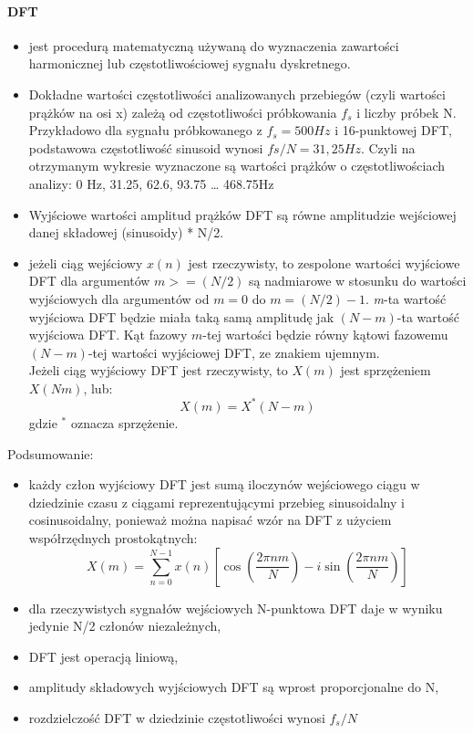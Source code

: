\documentclass[a4paper,twoside]{report}
\begin{document}
\paragraph{DFT}
\begin{itemize}
	\item jest procedurą matematyczną używaną do wyznaczenia zawartości harmonicznej lub częstotliwościowej sygnału dyskretnego.
	\item Dokładne wartości częstotliwości analizowanych przebiegów (czyli wartości prążków na osi x) zależą od częstotliwości próbkowania $ f_s $ i liczby próbek N. Przykładowo dla sygnału próbkowanego z $ f_s = 500 Hz $  i 16-punktowej DFT, podstawowa częstotliwość sinusoid wynosi $ fs/N= 31,25 Hz$. Czyli na otrzymanym wykresie wyznaczone są wartości prążków o częstotliwościach analizy: 0 Hz, 31.25, 62.6, 93.75 … 468.75Hz
	\item Wyjściowe wartości amplitud prążków DFT są równe amplitudzie wejściowej danej składowej (sinusoidy) * N/2.
	\item jeżeli ciąg wejściowy $ x(n) $ jest rzeczywisty, to zespolone wartości wyjściowe DFT dla argumentów $ m >= (N/2) $ są nadmiarowe w stosunku do wartości wyjściowych dla argumentów od $ m = 0 $ do $ m = (N/2)-1 $. \textit{m}-ta wartość wyjściowa DFT będzie miała taką samą amplitudę jak $(N-m)$-ta wartość wyjściowa DFT. Kąt fazowy $m$-tej wartości będzie równy kątowi fazowemu $(N-m)$-tej wartości wyjściowej DFT, ze znakiem ujemnym. \\
	Jeżeli ciąg wyjściowy DFT jest rzeczywisty, to $X(m)$ jest sprzężeniem $X(Nm)$, lub:
$$ X(m) = X^*(N-m) $$
gdzie $ ^* $ oznacza sprzężenie.
\end{itemize}

Podsumowanie:
\begin{itemize}
	\item każdy człon wyjściowy DFT jest sumą iloczynów wejściowego ciągu w dziedzinie czasu z ciągami reprezentującymi przebieg sinusoidalny i cosinusoidalny, ponieważ można napisać wzór na DFT z użyciem współrzędnych prostokątnych:
	$$ X(m)= \sum_{n=0}^{N-1}{x(n) [\cos(\frac{2 \pi n m}{N}) - i \sin(\frac{2 \pi n m}{N})]}   $$
	\item dla rzeczywistych sygnałów wejściowych N-punktowa DFT daje w wyniku jedynie N/2 członów niezależnych,
	\item DFT jest operacją liniową,
	\item amplitudy składowych wyjściowych DFT są wprost proporcjonalne do N,
	\item rozdzielczość DFT w dziedzinie częstotliwości wynosi $ f_s/N $
\end{itemize}
\end{document}

